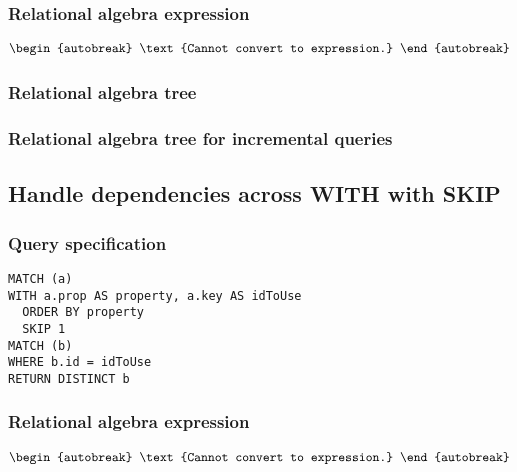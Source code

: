 \subsubsection*{Relational algebra expression}

\begin{align*}
\begin{autobreak}
\text{Cannot convert to expression.}
\end{autobreak}
\end{align*}

\subsubsection*{Relational algebra tree}


\subsubsection*{Relational algebra tree for incremental queries}


\subsection{Handle dependencies across WITH with SKIP}

\subsubsection*{Query specification}

\begin{lstlisting}
MATCH (a)
WITH a.prop AS property, a.key AS idToUse
  ORDER BY property
  SKIP 1
MATCH (b)
WHERE b.id = idToUse
RETURN DISTINCT b
\end{lstlisting}

\subsubsection*{Relational algebra expression}

\begin{align*}
\begin{autobreak}
\text{Cannot convert to expression.}
\end{autobreak}
\end{align*}

